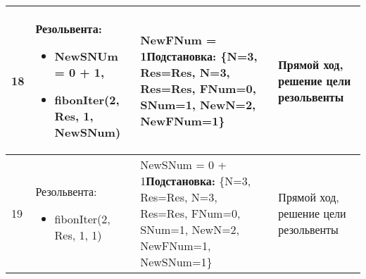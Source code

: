 \documentclass[14pt,a4paper]{scrreprt}
\begin{document}
\begin{table}[H]
\begin{tabular}{|p{0.8cm\small}|p{4.7cm\small}|p{5.7cm\small}|p{4cm\small}|}
		\hline
		18 & Резольвента:\begin{itemize} \item NewSNUm = 0 + 1, \item fibonIter(2, Res, 1, NewSNum) \end{itemize} & NewFNum = 1\linebreak \textbf{Подстановка:} \{N=3, Res=Res, N=3, Res=Res, FNum=0, SNum=1, NewN=2, NewFNum=1\} & Прямой ход, решение цели резольвенты\\
		\hline
		19 & Резольвента:\begin{itemize} \item fibonIter(2, Res, 1, 1) \end{itemize} & NewSNum = 0 + 1\linebreak \textbf{Подстановка:} \{N=3, Res=Res, N=3, Res=Res, FNum=0, SNum=1, NewN=2, NewFNum=1, NewSNum=1\} & Прямой ход, решение цели резольвенты\\
		\hline
	\end{tabular}
\end{table}
\end{document}
